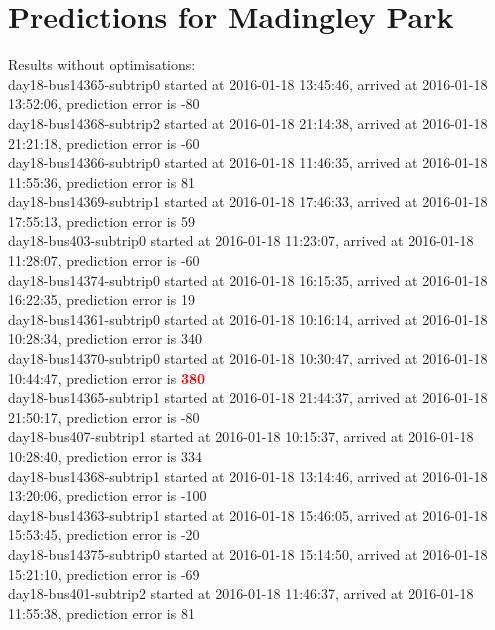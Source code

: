 \documentclass[12pt,a4paper,oneside,openright]{report}
\begin{document}
\newpage

\section{Predictions for Madingley Park}

Results without optimisations: \\

{\footnotesize
day18-bus14365-subtrip0 started at 2016-01-18 13:45:46, arrived at 2016-01-18 13:52:06, prediction error is -80 \\
day18-bus14368-subtrip2 started at 2016-01-18 21:14:38, arrived at 2016-01-18 21:21:18, prediction error is -60 \\
day18-bus14366-subtrip0 started at 2016-01-18 11:46:35, arrived at 2016-01-18 11:55:36, prediction error is 81 \\
day18-bus14369-subtrip1 started at 2016-01-18 17:46:33, arrived at 2016-01-18 17:55:13, prediction error is 59 \\
day18-bus403-subtrip0 started at 2016-01-18 11:23:07,    arrived at 2016-01-18 11:28:07, prediction error is -60 \\
day18-bus14374-subtrip0 started at 2016-01-18 16:15:35, arrived at 2016-01-18 16:22:35, prediction error is 19 \\
day18-bus14361-subtrip0 started at 2016-01-18 10:16:14, arrived at 2016-01-18 10:28:34, prediction error is 340 \\
day18-bus14370-subtrip0 started at 2016-01-18 10:30:47, arrived at 2016-01-18 10:44:47, prediction error is \textcolor{red}{\textbf{380}} \\ 
day18-bus14365-subtrip1 started at 2016-01-18 21:44:37, arrived at 2016-01-18 21:50:17, prediction error is -80 \\
day18-bus407-subtrip1 started at 2016-01-18 10:15:37,    arrived at 2016-01-18 10:28:40, prediction error is 334 \\
day18-bus14368-subtrip1 started at 2016-01-18 13:14:46, arrived at 2016-01-18 13:20:06, prediction error is -100 \\
day18-bus14363-subtrip1 started at 2016-01-18 15:46:05, arrived at 2016-01-18 15:53:45, prediction error is -20 \\
day18-bus14375-subtrip0 started at 2016-01-18 15:14:50, arrived at 2016-01-18 15:21:10, prediction error is -69 \\
day18-bus401-subtrip2 started at 2016-01-18 11:46:37,    arrived at 2016-01-18 11:55:38, prediction error is 81 \\
}
\end{document}
